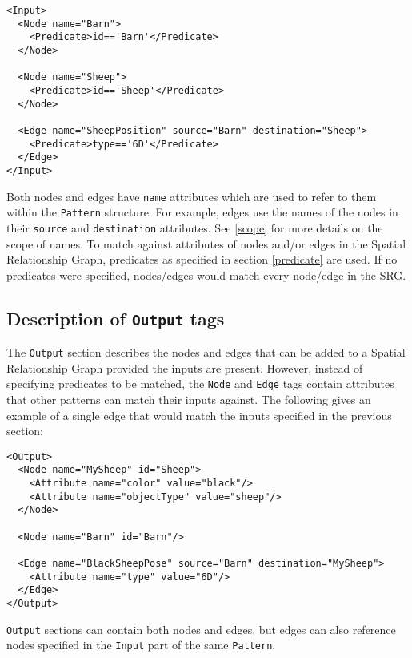 \documentclass[11pt]{article}
\begin{document}
\begin{Verbatim}[fontsize=\footnotesize,tabsize=2] 
<Input>
  <Node name="Barn">
    <Predicate>id=='Barn'</Predicate>
  </Node>

  <Node name="Sheep">
    <Predicate>id=='Sheep'</Predicate>
  </Node>

  <Edge name="SheepPosition" source="Barn" destination="Sheep">
    <Predicate>type=='6D'</Predicate>
  </Edge>
</Input>
\end{Verbatim} 

Both nodes and edges have \texttt{name}
attributes which are used to refer to them within the \texttt{Pattern} structure.
For example, edges use the names of the nodes in their \texttt{source} and \texttt{destination} attributes. See \ref{scope} for more details on the scope of names. To match against attributes of nodes and/or edges in the Spatial Relationship
Graph, predicates as specified in section \ref{predicate} are used. If no predicates were
specified, nodes/edges would match every node/edge in the SRG.

\subsection{Description of \texttt{Output} tags}
\label{output}

The \texttt{Output} section
describes the nodes and edges that can be added to a Spatial Relationship Graph
provided the inputs are present. However, instead of specifying predicates to
be matched, the \texttt{Node} and \texttt{Edge} tags contain attributes that other patterns can match their
inputs against. The following gives an example of a single edge that would
match the inputs specified in the previous section:

\begin{Verbatim}[fontsize=\footnotesize,tabsize=2] 
<Output>
  <Node name="MySheep" id="Sheep">
    <Attribute name="color" value="black"/>
    <Attribute name="objectType" value="sheep"/>
  </Node>

  <Node name="Barn" id="Barn"/>

  <Edge name="BlackSheepPose" source="Barn" destination="MySheep">
    <Attribute name="type" value="6D"/>
  </Edge>
</Output>
\end{Verbatim} 

\texttt{Output} sections can contain both nodes and edges, but edges can also reference
nodes specified in the \texttt{Input} part of the same \texttt{Pattern}.
\end{document}
